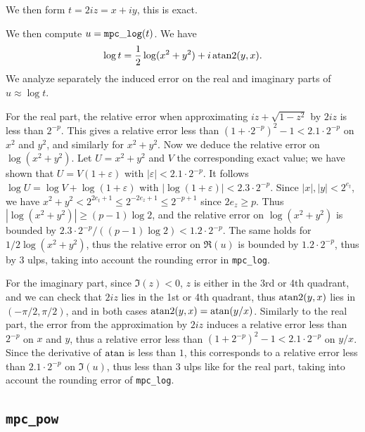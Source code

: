 \documentclass [11pt]{article}
\begin{document}
We then form $t = 2iz = x + iy$, this is exact.

We then compute $u = {\tt mpc\_log}(t)$.
We have
\[ \log t = \frac{1}{2} \log(x^2+y^2) + i \, {\rm atan2}(y,x). \]
We analyze separately the induced error on the real and imaginary parts
of $u \approx \log t$.

For the real part, the relative error when approximating
$iz + \sqrt{1-z^2}$ by $2iz$ is less than $2^{-p}$.
This gives a relative error less than $(1 + \cdot 2^{-p})^2 - 1 < 2.1 \cdot 2^{-p}$
on $x^2$ and $y^2$, and similarly for $x^2+y^2$.
Now we deduce the relative error on $\log(x^2+y^2)$.
Let $U = x^2+y^2$ and $V$ the corresponding exact value;
we have shown that $U = V (1 + \varepsilon)$ with
$|\varepsilon| < 2.1 \cdot 2^{-p}$.
It follows $\log U = \log V + \log(1 + \varepsilon)$
with $|\log(1 + \varepsilon)| < 2.3 \cdot 2^{-p}$.
Since $|x|, |y| < 2^{e_t}$, we have $x^2+y^2 < 2^{2e_t+1} \le 2^{-2e_z+1}
\le 2^{-p+1}$ since $2e_z \ge p$.
Thus $|\log(x^2+y^2)| \ge (p-1) \log 2$,
and the relative error on $\log(x^2+y^2)$ is bounded by
$2.3 \cdot 2^{-p}/((p-1) \log 2) < 1.2 \cdot 2^{-p}$.
The same holds for $1/2 \log(x^2+y^2)$, thus the relative error on $\Re(u)$
is bounded by $1.2 \cdot 2^{-p}$, thus by $3$ ulps, taking into account
the rounding error in \verb|mpc_log|.

For the imaginary part, since $\Im(z) < 0$, $z$ is either in the 3rd or 4th
quadrant, and we can check that $2iz$ lies in the 1st or 4th
quadrant, thus ${\rm atan2}(y,x)$ lies in $(-\pi/2,\pi/2)$, and in both
cases ${\rm atan2}(y,x) = {\rm atan}(y/x)$.
Similarly to the real part, the error from the approximation by $2iz$
induces a relative error less than $2^{-p}$ on $x$ and $y$,
thus a relative error less than $(1 + 2^{-p})^2-1 < 2.1 \cdot 2^{-p}$
on $y/x$.
Since the derivative of $\rm atan$ is less than $1$, this corresponds
to a relative error less than $2.1 \cdot 2^{-p}$ on $\Im(u)$,
thus less than $3$ ulps like for the real part,
taking into account the rounding error of \verb|mpc_log|.

\subsection {\texttt {mpc\_pow}}
\end{document}
